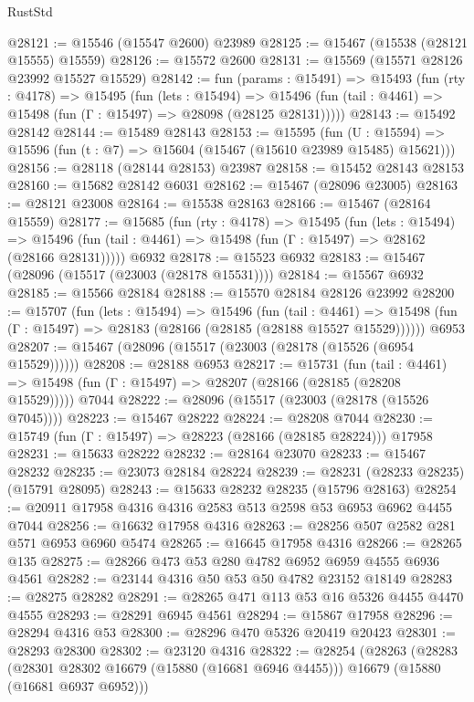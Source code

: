 \begin{lexlean}{RustStd}
\begin{coremodule}
@28121 := @15546 (@15547 @2600) @23989
@28125 := @15467 (@15538 (@28121 @15555) @15559)
@28126 := @15572 @2600
@28131 := @15569 (@15571 @28126 @23992 @15527 @15529)
@28142 := fun (params : @15491) =>
  @15493
    (fun (rty : @4178) =>
    @15495
      (fun (lets : @15494) =>
      @15496 (fun (tail : @4461) => @15498 (fun (Γ : @15497) => @28098 (@28125 @28131)))))
@28143 := @15492 @28142
@28144 := @15489 @28143
@28153 := @15595
    (fun (U : @15594) => @15596 (fun (t : @7) => @15604 (@15467 (@15610 @23989 @15485) @15621)))
@28156 := @28118 (@28144 @28153) @23987
@28158 := @15452 @28143 @28153
@28160 := @15682 @28142 @6031
@28162 := @15467 (@28096 @23005)
@28163 := @28121 @23008
@28164 := @15538 @28163
@28166 := @15467 (@28164 @15559)
@28177 := @15685
    (fun (rty : @4178) =>
    @15495
      (fun (lets : @15494) =>
      @15496 (fun (tail : @4461) => @15498 (fun (Γ : @15497) => @28162 (@28166 @28131)))))
    @6932
@28178 := @15523 @6932
@28183 := @15467 (@28096 (@15517 (@23003 (@28178 @15531))))
@28184 := @15567 @6932
@28185 := @15566 @28184
@28188 := @15570 @28184 @28126 @23992
@28200 := @15707
    (fun (lets : @15494) =>
    @15496
      (fun (tail : @4461) =>
      @15498 (fun (Γ : @15497) => @28183 (@28166 (@28185 (@28188 @15527 @15529))))))
    @6953
@28207 := @15467 (@28096 (@15517 (@23003 (@28178 (@15526 (@6954 @15529))))))
@28208 := @28188 @6953
@28217 := @15731
    (fun (tail : @4461) => @15498 (fun (Γ : @15497) => @28207 (@28166 (@28185 (@28208 @15529)))))
    @7044
@28222 := @28096 (@15517 (@23003 (@28178 (@15526 @7045))))
@28223 := @15467 @28222
@28224 := @28208 @7044
@28230 := @15749 (fun (Γ : @15497) => @28223 (@28166 (@28185 @28224))) @17958
@28231 := @15633 @28222
@28232 := @28164 @23070
@28233 := @15467 @28232
@28235 := @23073 @28184 @28224
@28239 := @28231 (@28233 @28235) (@15791 @28095)
@28243 := @15633 @28232 @28235 (@15796 @28163)
@28254 := @20911 @17958 @4316 @4316 @2583 @513 @2598 @53 @6953 @6962 @4455 @7044
@28256 := @16632 @17958 @4316
@28263 := @28256 @507 @2582 @281 @571 @6953 @6960 @5474
@28265 := @16645 @17958 @4316
@28266 := @28265 @135
@28275 := @28266 @473 @53 @280 @4782 @6952 @6959 @4555 @6936 @4561
@28282 := @23144 @4316 @50 @53 @50 @4782 @23152 @18149
@28283 := @28275 @28282
@28291 := @28265 @471 @113 @53 @16 @5326 @4455 @4470 @4555
@28293 := @28291 @6945 @4561
@28294 := @15867 @17958
@28296 := @28294 @4316 @53
@28300 := @28296 @470 @5326 @20419 @20423
@28301 := @28293 @28300
@28302 := @23120 @4316
@28322 := @28254
    (@28263
      (@28283
        (@28301 @28302 @16679 (@15880 (@16681 @6946 @4455)))
        @16679
        (@15880 (@16681 @6937 @6952)))

\end{coremodule}
\end{lexlean}
